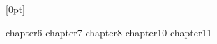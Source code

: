 \documentclass{report}
\begin{document}




  [0pt]
  {\addvspace{1em}}
  {\bfseries\chaptername\ \thecontentslabel\quad}
  {}
  {\bfseries\hfill\contentspage}
\tableofcontents

\newpage


\newpage
{}
{chapter6}
{chapter7}
{chapter8}
{chapter10}
{chapter11}
\end{document}
